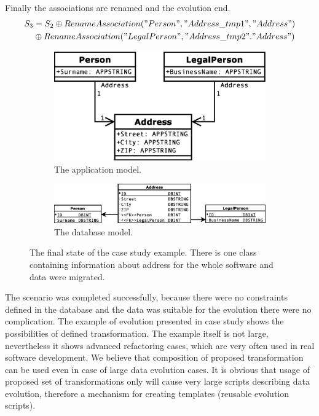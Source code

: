 \documentclass[11pt]{article}
\begin{document}
Finally the associations are renamed and the evolution end.
\begin{align*}
S_3 &= S_2  \oplus RenameAssociation("Person", "Address\_tmp1", "Address")\\
& \oplus RenameAssociation("LegalPerson", "Address\_tmp2". "Address")\\
\end{align*}

\begin{figure}
\begin{subfigure}[b]{0.5\textwidth}
	\includegraphics[width=\textwidth]{./images/case_app_9}
	\caption{The application model.}
\end{subfigure}
\begin{subfigure}[b]{0.5\textwidth}
	\includegraphics[width=\textwidth]{./images/case_db_8}
	\caption{The database model.}
\end{subfigure}
	\caption{The final state of the case study example. There is one class containing information about address for the whole software and data were migrated.}
\end{figure}

The scenario was completed successfully, because there were no constraints defined in the database and the data was suitable for the evolution there were no complication. The example of evolution presented in case study shows the possibilities of defined transformation. The example itself is not large, nevertheless it shows advanced refactoring cases, which are very often used in real software development. We believe that composition of proposed transformation can be used even in case of large data evolution cases. It is obvious that usage of proposed set of transformations only will cause very large scripts describing data evolution, therefore a mechanism for creating templates (reusable evolution scripts).
\end{document}
